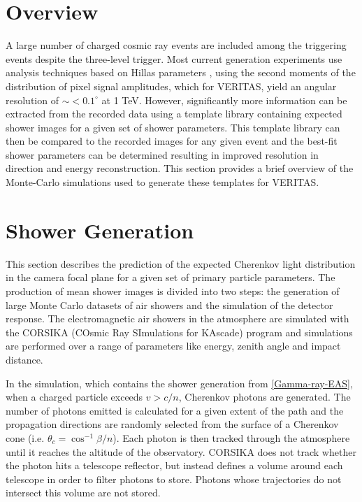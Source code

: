 \documentclass[main.tex]{subfiles}
\begin{document}
\section{Overview}
A large number of charged cosmic ray events are included among the triggering events despite the three-level trigger. Most current generation experiments use analysis techniques based on Hillas parameters \cite{Hillas:1985}, using the second moments of the distribution of pixel signal amplitudes, which for VERITAS, yield an angular resolution of $\sim <0.1^\circ$ at 1 TeV. However, significantly more information can be extracted from the recorded data using a template library containing expected shower images for a given set of shower parameters. This template library can then be compared to the recorded images for any given event and the best-fit shower parameters can be determined resulting in improved resolution in direction and energy reconstruction. This section provides a brief overview of the Monte-Carlo simulations used to generate these templates for VERITAS.

\section{Shower Generation}
This section describes the prediction of the expected Cherenkov light distribution in the camera focal plane for a given set of primary particle parameters. The production of mean shower images is divided into two steps: the generation of large Monte Carlo datasets of air showers and the simulation of the detector response. The electromagnetic air showers in the atmosphere are simulated with the CORSIKA (COsmic Ray SImulations for KAscade) program and simulations are performed over a range of parameters like energy, zenith angle and impact distance. 

In the simulation, which contains the shower generation from \ref{Gamma-ray-EAS}, when a charged particle exceeds $v>c/n$, Cherenkov photons are generated. The number of photons emitted is calculated for a given extent of the path and the propagation directions are randomly selected from the surface of a Cherenkov cone (i.e. $\theta_c = \cos^{-1}\beta/n$). Each photon is then tracked through the atmosphere until it reaches the altitude of the observatory. CORSIKA does not track whether the photon hits a telescope reflector, but instead defines a volume around each telescope in order to filter photons to store. Photons whose trajectories do not intersect this volume are not stored.
\end{document}
